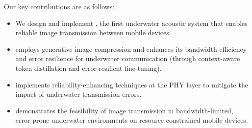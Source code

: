 Our key contributions are as follows:
\begin{itemize}
[topsep=2pt,noitemsep,leftmargin=*]
\item We design and implement \sysname, the first underwater acoustic system
that enables reliable image transmission between mobile devices.
\item \sysname employs generative image compression and enhances its
bandwidth efficiency and error resilience for underwater communication
(through context-aware token distillation and error-resilient fine-tuning).
\item \sysname implements reliability-enhancing techniques at the PHY
layer to mitigate the impact of underwater transmission errors.
\item \sysname demonstrates the feasibility of image transmission in
bandwidth-limited, error-prone underwater environments on
resource-constrained mobile devices.
\end{itemize}

